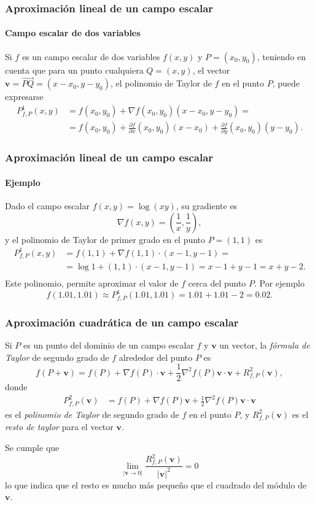 \begin{frame}
	\frametitle{Aproximación lineal de un campo escalar}
	\framesubtitle{Campo escalar de dos variables}
	Si $f$ es un campo escalar de dos variables $f(x,y)$ y $P=(x_0,y_0)$, teniendo en cuenta que para un punto cualquiera $Q=(x,y)$, el vector $\mathbf{v}=\vec{PQ}=(x-x_0,y-y_0)$, el polinomio de Taylor de $f$
	en el punto $P$, puede expresarse
	\begin{align*}
		P^1_{f,P}(x,y) & = f(x_0,y_0)+\nabla f(x_0,y_0)(x-x_0,y-y_0) =                                                             \\
		               & = f(x_0,y_0)+\frac{\partial f}{\partial x}(x_0,y_0)(x-x_0)+\frac{\partial f}{\partial y}(x_0,y_0)(y-y_0). 
	\end{align*}
\end{frame}


\begin{frame}
	\frametitle{Aproximación lineal de un campo escalar}
	\framesubtitle{Ejemplo}
	Dado el campo escalar $f(x,y)=\log(xy)$, su gradiente es
	\[
		\nabla f(x,y) = \left(\frac{1}{x},\frac{1}{y}\right),
	\]
	y el polinomio de Taylor de primer grado en el punto $P=(1,1)$ es
	\begin{align*}
		P^1_{f,P}(x,y) & = f(1,1) +\nabla f(1,1)\cdot (x-1,y-1) =        \\
		               & = \log 1+(1,1)\cdot(x-1,y-1) = x-1+y-1 = x+y-2. \\
	\end{align*}
	Este polinomio, permite aproximar el valor de $f$ cerca del punto $P$.
	Por ejemplo
	\[ 
		f(1.01,1.01) \approx P^1_{f,P}(1.01,1.01) = 1.01+1.01-2 = 0.02.
	\]
\end{frame}


\begin{frame}
	\frametitle{Aproximación cuadrática de un campo escalar}
	Si $P$ es un punto del dominio de un campo escalar $f$ y $\mathbf{v}$ un vector, la \emph{fórmula de Taylor} de segundo
	grado de $f$ alrededor del punto $P$ es
	\[
		f(P+\mathbf{v}) = f(P) + \nabla f(P)\cdot \mathbf{v} + \frac{1}{2}\nabla^2f(P)\mathbf{v}\cdot\mathbf{v} + R^2_{f,P}(\mathbf{v}),
	\]
	donde 
	\begin{align*}
		P^2_{f,P}(\mathbf{v}) & =f(P)+\nabla f(P)\mathbf{v}+\frac{1}{2}\nabla^2f(P)\mathbf{v}\cdot\mathbf{v} 
	\end{align*}
	es el \emph{polinomio de Taylor} de segundo grado de $f$ en el punto $P$, y $R^2_{f,P}(\mathbf{v})$ es el \emph{resto de taylor} para el vector $\mathbf{v}$.
	
	Se cumple que  
	\[
		\lim_{|\mathbf{v}\rightarrow 0|} \frac{R^2_{f,P}(\mathbf{v})}{|\mathbf{v}|^2} = 0
	\]
	lo que indica que el resto es mucho más pequeño que el cuadrado del módulo de $\mathbf{v}$.
\end{frame}


